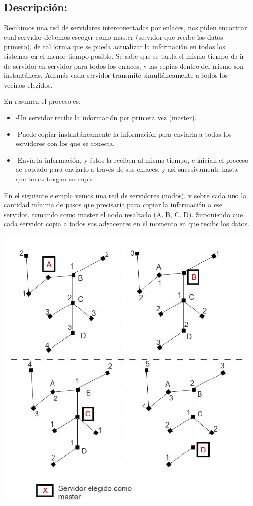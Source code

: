 \subsection{Descripción:}

Recibimos una red de servidores interconectados por enlaces, nos piden encontrar cual servidor debemos escoger como master (servidor que recibe los datos primero), de tal forma que se pueda actualizar la información en todos los sistemas en el menor tiempo posible.
Se sabe que se tarda el mismo tiempo de ir de servidor en servidor para todos los enlaces, y las copias dentro del mismo son instantáneas.
Además cada servidor transmite simultáneamente a todos los vecinos elegidos.

En resumen el proceso es:
\begin{itemize}
\item -Un servidor recibe la información por primera vez (master).
\item-Puede copiar instantáneamente la información para enviarla a todos los servidores con los que se conecta.
\item-Envía la información, y éstos la reciben al mismo tiempo, e inician el proceso de copiado para enviarlo a través de sus enlaces, y asi sucesivamente hasta que todos tengan su copia.
\end{itemize}
En el siguiente ejemplo vemos una red de servidores (nodos), y sobre cada uno la cantidad mínima de pasos que precisaría para copiar la información a ese servidor, tomando como master el nodo resaltado (A, B, C, D). Suponiendo que cada servidor copia a todos sus adyacentes en el momento en que recibe los datos.

\begin{center}
\includegraphics[scale=0.6]{ej2/2/graficos/imagen01.jpg} 
\end{center}

